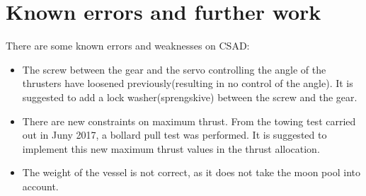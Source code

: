 \section*{Known errors and further work}
There are some known errors and weaknesses on CSAD: 
\begin{itemize}
	\item The screw between the gear and the servo controlling the angle of the thrusters have loosened previously(resulting in no control of the angle). It is suggested to add a lock washer(sprengskive) between the screw and the gear.
	\item There are new constraints on maximum thrust. From the towing test carried out in Juny 2017, a bollard pull test was performed. It is suggested to implement this new maximum thrust values in the thrust allocation. 
	\item The weight of the vessel is not correct, as it does not take the moon pool into account. 
\end{itemize}